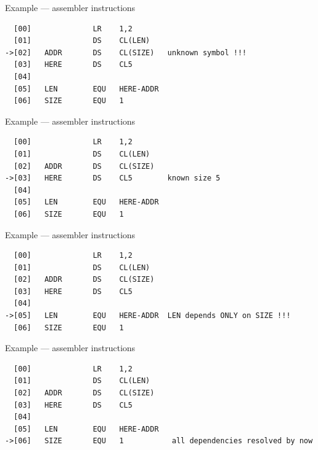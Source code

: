 \documentclass[10pt]{beamer}
\begin{document}
\begin{frame}[fragile]{Example --- assembler instructions}
	
	\begin{verbatim}
  [00]              LR    1,2
  [01]              DS    CL(LEN)
->[02]   ADDR       DS    CL(SIZE)   unknown symbol !!!
  [03]   HERE       DS    CL5
  [04]
  [05]   LEN        EQU   HERE-ADDR
  [06]   SIZE       EQU   1
\end{verbatim}
	
	\mem{}{}{\rotc}{}
	
\end{frame}

\begin{frame}[fragile]{Example --- assembler instructions}
	
	\begin{verbatim}
  [00]              LR    1,2
  [01]              DS    CL(LEN)
  [02]   ADDR       DS    CL(SIZE)
->[03]   HERE       DS    CL5        known size 5
  [04]
  [05]   LEN        EQU   HERE-ADDR
  [06]   SIZE       EQU   1
	\end{verbatim}
	
	\mem{}{}{}{\rotc}
	
\end{frame}

\begin{frame}[fragile]{Example --- assembler instructions}
	
	\begin{verbatim}
  [00]              LR    1,2
  [01]              DS    CL(LEN)
  [02]   ADDR       DS    CL(SIZE)
  [03]   HERE       DS    CL5        
  [04]
->[05]   LEN        EQU   HERE-ADDR  LEN depends ONLY on SIZE !!!
  [06]   SIZE       EQU   1
	\end{verbatim}
	
	\mem{}{}{}{}
	
\end{frame}

\begin{frame}[fragile]{Example --- assembler instructions}
	
	\begin{verbatim}
  [00]              LR    1,2
  [01]              DS    CL(LEN)
  [02]   ADDR       DS    CL(SIZE)
  [03]   HERE       DS    CL5        
  [04]
  [05]   LEN        EQU   HERE-ADDR
->[06]   SIZE       EQU   1           all dependencies resolved by now
	\end{verbatim}
	
	\mem{}{}{}{}
	
\end{frame}
\end{document}
